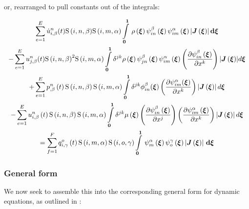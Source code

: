 or, rearranged to pull constants out of the integrals:

\begin{multline}
 \label{NSEFEM4}
  \dsum_{e=1}^{E}{\idxnodedof{\dot{u}}{i}{n}{\beta}}(t){\idxgsf{i}{n}{\beta}}{\idxgsf{i}{m}{\alpha}}
  \gint{\vectr{0}}{\vectr{1}}{\fnof{\rho}{\vectr{\xi}}{\idxgbfn{i}{n}{\beta}{\vectr{\xi}}\idxgbfn{i}{m}{\alpha}{\vectr{\xi}}
  \abs{\fnof{\matr{J}}{\vectr{\xi}}}}}{\vectr{\xi}}\\
  -\dsum_{e=1}^{E}{\idxnodedof{u}{j}{n}{\beta}}(t){\idxgsf{i}{n}{\beta}}^2{\idxgsf{i}{m}{\alpha}}
   \dintl{\vectr{0}}{\vectr{1}}\delta^{jk}{\fnof{\rho}{\vectr{\xi}}\idxgbfn{j}{n}{\beta}{\vectr{\xi}}
   \idxgbfn{i}{m}{\alpha}{\vectr{\xi}}
     \pbrac{\delby{\idxgbfn{i}{n}{\beta}{\vectr{\xi}}}{x^{k}}}
  \abs{\fnof{\matr{J}}{\vectr{\xi}}}}d{\vectr{\xi}}\\
    +\dsum_{e=1}^{E}{\fnof{\idxnodedof{p}{}{n}{\beta}}{t}\idxgsf{i}{n}{\beta}\idxgsf{i}{m}{\alpha}}
    \dintl{\vectr{0}}{\vectr{1}}\delta^{jk}\phi_{in}^{\beta}({\vectr{\xi}})
    \pbrac{\delby{\psi_{im}^{\alpha}({\vectr{\xi}})}{x^{k}}}\abs{\fnof{\matr{J}}{\vectr{\xi}}}d\vectr{\xi}\\
    -\dsum_{e=1}^{E}\fnof{\idxnodedof{u}{i}{n}{\beta}}{t}\idxgsf{i}{n}{\beta}\idxgsf{i}{m}{\alpha}
    \dintl{\vectr{0}}{\vectr{1}}{\delta^{jk}\fnof{\mu}{\vectr{\xi}}}\pbrac{\delby{\idxgbfn{i}{n}{\beta}{\vectr{\xi}}}{x^{j}}}
      \pbrac{\delby{\idxgbfn{i}{m}{\alpha}{\vectr{\xi}}}{x^{k}}}
      \abs{\fnof{\matr{J}}{\vectr{\xi}}}d{\vectr{\xi}}\\
  =\dsum_{f=1}^{F}\fnof{\idxnodedof{q}{i}{o}{\gamma}}{t}\idxgsf{i}{m}{\alpha}\idxgsf{i}{o}{\gamma}
   \gint{\vectr{0}}{\vectr{1}}{\gbfn{m}{\alpha}{\vectr{\xi}}\gbfn{o}{\gamma}{\vectr{\xi}}
    \abs{\fnof{\matr{J}}{\vectr{\xi}}}}{\vectr{\xi}}
\end{multline}


\subsubsection{General form}

We now seek to assemble this into the corresponding general form for dynamic equations, as outlined in :

